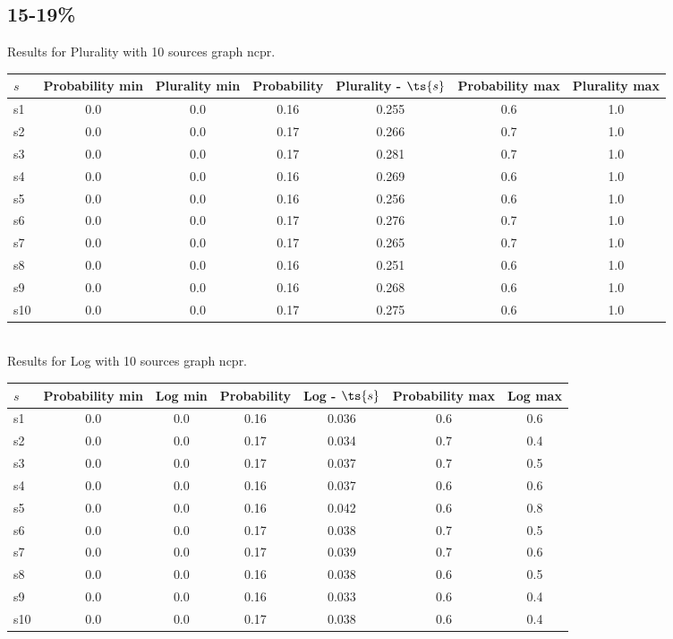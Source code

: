\documentclass{article}
\begin{document}
\newpage

\subsection{15-19\%}

\noindent Results for Plurality with 10 sources graph ncpr.

\noindent\begin{tabular}{|l|c|c|c|c|c|c|}
\hline
$s$& Probability min & Plurality min & Probability & Plurality - $\ts{s}$ & Probability max & Plurality max\\
\hline
s1 &0.0 & 0.0 & 0.16 & 0.255 & 0.6 & 1.0\\
\hline
s2 &0.0 & 0.0 & 0.17 & 0.266 & 0.7 & 1.0\\
\hline
s3 &0.0 & 0.0 & 0.17 & 0.281 & 0.7 & 1.0\\
\hline
s4 &0.0 & 0.0 & 0.16 & 0.269 & 0.6 & 1.0\\
\hline
s5 &0.0 & 0.0 & 0.16 & 0.256 & 0.6 & 1.0\\
\hline
s6 &0.0 & 0.0 & 0.17 & 0.276 & 0.7 & 1.0\\
\hline
s7 &0.0 & 0.0 & 0.17 & 0.265 & 0.7 & 1.0\\
\hline
s8 &0.0 & 0.0 & 0.16 & 0.251 & 0.6 & 1.0\\
\hline
s9 &0.0 & 0.0 & 0.16 & 0.268 & 0.6 & 1.0\\
\hline
s10 &0.0 & 0.0 & 0.17 & 0.275 & 0.6 & 1.0\\
\hline
\end{tabular}\\

\noindent Results for Log with 10 sources graph ncpr.

\noindent\begin{tabular}{|l|c|c|c|c|c|c|}
\hline
$s$& Probability min & Log min & Probability & Log - $\ts{s}$ & Probability max & Log max\\
\hline
s1 &0.0 & 0.0 & 0.16 & 0.036 & 0.6 & 0.6\\
\hline
s2 &0.0 & 0.0 & 0.17 & 0.034 & 0.7 & 0.4\\
\hline
s3 &0.0 & 0.0 & 0.17 & 0.037 & 0.7 & 0.5\\
\hline
s4 &0.0 & 0.0 & 0.16 & 0.037 & 0.6 & 0.6\\
\hline
s5 &0.0 & 0.0 & 0.16 & 0.042 & 0.6 & 0.8\\
\hline
s6 &0.0 & 0.0 & 0.17 & 0.038 & 0.7 & 0.5\\
\hline
s7 &0.0 & 0.0 & 0.17 & 0.039 & 0.7 & 0.6\\
\hline
s8 &0.0 & 0.0 & 0.16 & 0.038 & 0.6 & 0.5\\
\hline
s9 &0.0 & 0.0 & 0.16 & 0.033 & 0.6 & 0.4\\
\hline
s10 &0.0 & 0.0 & 0.17 & 0.038 & 0.6 & 0.4\\
\hline
\end{tabular}\\
\end{document}
